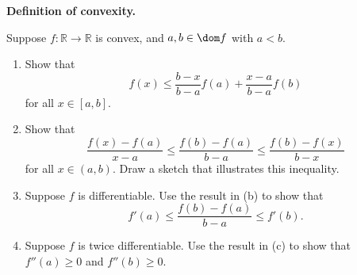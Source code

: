 \documentclass{ctexart}
\newif\ifpreface
\begin{document}
\large
\setlength{\baselineskip}{1.2em}
\ifpreface

\newgeometry{left=2cm,right=2cm,top=2cm,bottom=2cm}
\else
{}
\maketitle
\fi

\newcommand{\R}{\mathbb{R}}
\newcommand{\epi}{\operatorname{epi}}
\newcommand{\conv}{\operatorname{conv}}
\newcommand{\var}{\operatorname{var}}
\newcommand{\E}{\mathbf{E}}
\begin{problem}\label{3.1}
  \textbf{Definition of convexity.}

  Suppose $f:\mathbb{R}\to\mathbb{R}$ is convex, and $a,b\in\dom f$ with $a<b$.
  \begin{enumerate}
    \item Show that
      \[
        f(x)\leq \frac{b-x}{b-a}f(a)+\frac{x-a}{b-a}f(b)
      \]
      for all $x\in[a,b]$.

    \item Show that
      \[
        \frac{f(x)-f(a)}{x-a}\leq
        \frac{f(b)-f(a)}{b-a}\leq
        \frac{f(b)-f(x)}{b-x}
      \]
      for all $x\in(a,b)$. Draw a sketch that illustrates this inequality.

    \item Suppose $f$ is differentiable. Use the result in (b) to show that
      \[
        f'(a)\leq \frac{f(b)-f(a)}{b-a}\leq f'(b).
      \]

    \item Suppose $f$ is twice differentiable. Use the result in (c) to show that
      $f''(a)\geq0$ and $f''(b)\geq0$.
  \end{enumerate}
\end{problem}
\end{document}
